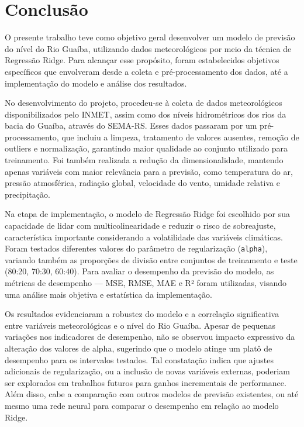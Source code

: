\chapter{Conclusão}
O presente trabalho teve como objetivo geral desenvolver um modelo de previsão do nível do Rio Guaíba, utilizando dados meteorológicos por meio da técnica de Regressão Ridge. Para alcançar esse propósito, foram estabelecidos objetivos específicos que envolveram desde a coleta e pré-processamento dos dados, até a implementação do modelo e análise dos resultados.

No desenvolvimento do projeto, procedeu-se à coleta de dados meteorológicos disponibilizados pelo INMET, assim como dos níveis hidrométricos dos rios da bacia do Guaíba, através do SEMA-RS. Esses dados passaram por um pré-processamento, que incluiu a limpeza, tratamento de valores ausentes, remoção de outliers e normalização, garantindo maior qualidade ao conjunto utilizado para treinamento. Foi também realizada a redução da dimensionalidade, mantendo apenas variáveis com maior relevância para a previsão, como temperatura do ar, pressão atmosférica, radiação global, velocidade do vento, umidade relativa e precipitação.

Na etapa de implementação, o modelo de Regressão Ridge foi escolhido por sua capacidade de lidar com multicolinearidade e reduzir o risco de sobreajuste, característica importante considerando a volatilidade das variáveis climáticas. Foram testados diferentes valores do parâmetro de regularização (\texttt{alpha}), variando também as proporções de divisão entre conjuntos de treinamento e teste (80:20, 70:30, 60:40). Para avaliar o desempenho da previsão do modelo, as métricas de desempenho — MSE, RMSE, MAE e R² foram utilizadas, visando uma análise mais objetiva e estatística da implementação.

Os resultados evidenciaram a robustez do modelo e a correlação significativa entre variáveis meteorológicas e o nível do Rio Guaíba. Apesar de pequenas variações nos indicadores de desempenho, não se observou impacto expressivo da alteração dos valores de alpha, sugerindo que o modelo atinge um platô de desempenho para os intervalos testados. Tal constatação indica que ajustes adicionais de regularização, ou a inclusão de novas variáveis externas, poderiam ser explorados em trabalhos futuros para ganhos incrementais de performance. Além disso, cabe a comparação com outros modelos de previsão existentes, ou até mesmo uma rede neural para comparar o desempenho em relação ao modelo Ridge.

